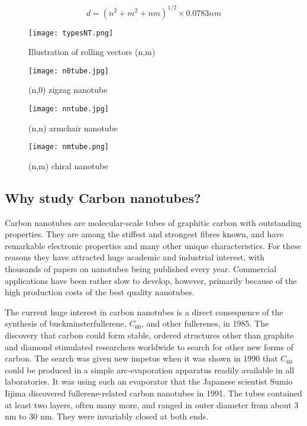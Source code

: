 \[d = (n^2 + m^2 + nm)^{1/2} \times 0.0783 nm\]
\begin{figure}
\centering
\texttt{[image: typesNT.png]}
\caption{Illustration of rolling vectors (n,m)}
\label{typesNT}
\end{figure}
\begin{figure}
\texttt{[image: n0tube.jpg]}
\caption{(n,0) zigzag nanotube }
\label{n0tube}
\end{figure}
\begin{figure}
\texttt{[image: nntube.jpg]}
\caption{(n,n) armchair nanotube}
\label{nntube}
\end{figure}
\begin{figure}
\texttt{[image: nmtube.png]}
\caption{(n,m) chiral nanotube}
\label{nmtube}
\end{figure}
\subsection {Why study Carbon nanotubes?}
Carbon nanotubes are molecular-scale tubes of graphitic carbon with outstanding properties. They are among the stiffest and strongest fibres known, and have remarkable electronic properties and many other unique characteristics. For these reasons they have attracted huge academic and industrial interest, with thousands of papers on nanotubes being published every year. Commercial applications have been rather slow to develop, however, primarily because of the high production costs of the best quality nanotubes.

The current huge interest in carbon nanotubes is a direct consequence of the synthesis of buckminsterfullerene, $C_{60}$, and other fullerenes, in 1985. The discovery that carbon could form stable, ordered structures other than graphite and diamond stimulated researchers worldwide to search for other new forms of carbon. The search was given new impetus when it was shown in 1990 that $C_{60}$ could be produced in a simple arc-evaporation apparatus readily available in all laboratories. It was using such an evaporator that the Japanese scientist Sumio Iijima discovered fullerene-related carbon nanotubes in 1991\cite{iijima1991helical}. The tubes contained at least two layers, often many more, and ranged in outer diameter from about 3 nm to 30 nm. They were invariably closed at both ends.

